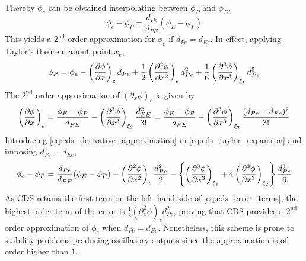 \noindent
Thereby $\phi_e$ can be obtained interpolating between $\phi_P$ and $\phi_E$,
\begin{equation} \label{eq:cds_e}
	\phi_e - \phi_P = \frac{d_{Pe}}{d_{PE}} (\phi_E - \phi_P)
\end{equation}
This yields a $2^{\text{nd}}$ order approximation for $\phi_e$ if $d_{Pe} =
d_{Ee}$. In effect, applying Taylor's theorem about point $x_e$,
\begin{equation} \label{eq:cds_taylor_expansion}
	\phi_P = 
	\phi_e 
	- \left(\pdv{\phi}{x}\right)_e d_{Pe} 
	+ \frac{1}{2} \left(\pdv[2]{\phi}{x}\right)_e d_{Pe}^2 
	+ \frac{1}{6} \left(\pdv[3]{\phi}{x}\right)_{\xi_1} d_{Pe}^3
\end{equation}
The $2^\text{nd}$ order approximation of $(\partial_x \phi)_e$ is given by
\begin{equation} \label{eq:cds_derivative_approximation}
	\left(\pdv{\phi}{x}\right)_e = 
	\frac{\phi_E - \phi_P}{d_{PE}} - \left(\pdv[3]{\phi}{x}\right)_{\xi_2} \frac{d_{PE}^2}{3!} = 	
	\frac{\phi_E - \phi_P}{d_{PE}} - \left(\pdv[3]{\phi}{x}\right)_{\xi_2} \frac{(d_{Pe} + d_{Ee})^2}{3!}
\end{equation}
Introducing \eqref{eq:cds_derivative_approximation} in
\eqref{eq:cds_taylor_expansion} and imposing $d_{Pe} = d_{Ee}$, 
\begin{equation} \label{eq:cds_error_terms}
	\phi_e - \phi_P = 
	\frac{d_{Pe}}{d_{PE}} (\phi_E - \phi_P) - 
	\left( \pdv[2]{\phi}{x} \right)_e \frac{d_{Pe}^2}{2} -
	\left\{ 
	\left( \pdv[3]{\phi}{x} \right)_{\xi_1} + 4 \left( \pdv[3]{\phi}{x} \right)_{\xi_2}
	\right\} 
	\frac{d_{Pe}^3}{6}
\end{equation}
As CDS retains the first term on the left--hand side of
\eqref{eq:cds_error_terms}, the highest order term of the error is $\frac{1}{2}
(\partial_x^2 \phi)_e d_{Pe}^2$, proving that CDS provides a $2^\text{nd}$ order
approximation of $\phi_e$ when $d_{Pe} = d_{Ee}$. Nonetheless, this scheme is
prone to stability problems producing oscillatory outputs since the
approximation is of order higher than $1$.